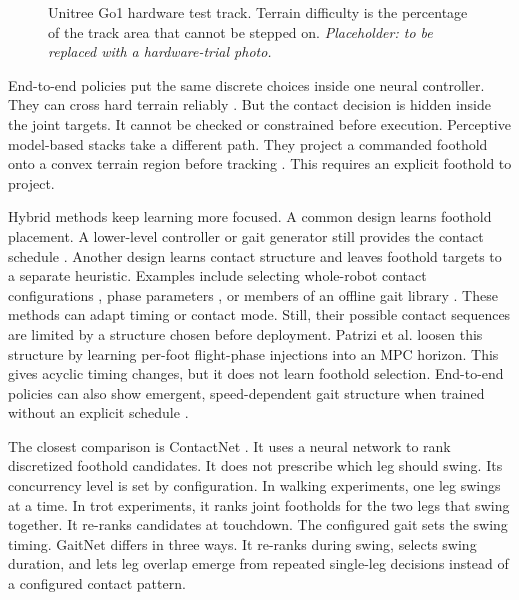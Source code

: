 \begin{figure}[t]
  \centering
  \caption{Unitree Go1 hardware test track. Terrain difficulty is the
    percentage of the track area that cannot be stepped on.
    \textit{Placeholder: to be replaced with a hardware-trial photo.}}
  \label{fig:figure-test-environment}
\end{figure}

End-to-end policies put the same discrete choices inside one
neural controller. They can cross hard terrain reliably
\cite{zhang_learning_2023, zhang_novel_2024, duan_sim--real_2022,
siekmann_blind_2021, lee_learning_2020}. But the contact decision is
hidden inside the joint targets. It cannot be checked or constrained
before execution. Perceptive model-based stacks take a different path.
They project a commanded foothold onto a convex terrain region before
tracking \cite{grandia_perceptive_2022, leggedperceptive}. This
requires an explicit foothold to project.

Hybrid methods keep learning more focused. A common design learns
foothold placement. A lower-level controller or gait generator still
provides the contact schedule
\cite{gangapurwala_rloc_2022, villarreal_fast_2019, omar_fast_2022,
omar_safesteps_2023, asselmeier_steppability-informed_2024,
gaspard_footstepnet_2024, peng_deeploco_2017, tsounis_deepgait_2020,
shi_terrain-aware_2023, xie_glide_2023}. Another design
learns contact structure and leaves foothold targets to a separate
heuristic. Examples include selecting whole-robot contact
configurations \cite{da_learning_2020}, phase parameters
\cite{yang_fast_2021}, or members of an offline gait library
\cite{sun_online_2024}. These methods can adapt timing or contact
mode. Still, their possible contact sequences are limited by a
structure chosen before deployment. Patrizi et al.
\cite{patrizi_rl-augmented_2026} loosen this structure by learning
per-foot flight-phase injections into an MPC horizon. This gives
acyclic timing changes, but it does not learn foothold selection.
End-to-end policies can also show emergent, speed-dependent gait
structure when trained without an explicit schedule
\cite{fu_minimizing_2021}.

The closest comparison is ContactNet \cite{bratta_contactnet_2024}.
It uses a neural network to rank discretized foothold candidates. It
does not prescribe which leg should swing. Its concurrency level is
set by configuration. In walking experiments, one leg swings at a
time. In trot experiments, it ranks joint footholds for the two legs
that swing together. It re-ranks candidates at touchdown. The
configured gait sets the swing timing. GaitNet differs in
three ways. It re-ranks during swing, selects swing duration, and lets
leg overlap emerge from repeated single-leg decisions instead of a
configured contact pattern.

